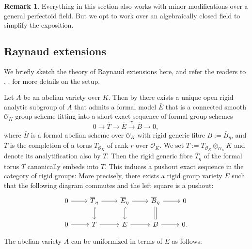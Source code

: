 \documentclass[10pt,oneside]{amsart}
\theoremstyle{definition}
\newtheorem{remark}[theorem]{Remark}
\begin{document}
	
	\begin{remark}\label{Remark on dealing with general perfectoid fields by Galois descent}
		Everything in this section also works with minor modifications over a general perfectoid field. But we opt to work over an algebraically closed field to simplify the exposition.
	\end{remark}
	
	
	\subsection{Raynaud extensions}
	
        We briefly sketch the theory of Raynaud extensions here, and refer the readers to \cite[\S8]{Bosch-Lut}, \cite[\S1]{BL}, \cite[\S8]{Lut-survey}\cite[\S6.1]{Lut} for more details on the setup.

	Let $A$ be an abelian variety over $K$. Then by \cite[Theorem~1.1]{BL} there exists a unique open rigid analytic subgroup of $A$ that admits a formal model $\overline E$ that is a connected smooth $\mathcal O_K$-group scheme fitting into a short exact sequence of formal group schemes
	\begin{equation}\label{formal Raynaud extension}
	0\rightarrow \overline T \rightarrow \overline E \xrightarrow{\pi} \overline{B}\rightarrow 0,
	\end{equation}
	where $\overline{B}$ is a formal abelian scheme over $\mathcal O_K$ with rigid generic fibre $B:=\overline{B}_\eta$, and $\overline{T}$ is the completion of a torus $T_{\mathcal O_K}$ of rank $r$ over $\mathcal O_K$.
	We set $T:=T_{\mathcal O_K}\otimes_{\mathcal O_K}K$ and denote its analytification also by $T$. Then the rigid generic fibre $\overline{T}_\eta$ of the formal torus $\overline{T}$ canonically embeds into $T$. This induces a pushout exact sequence in the category of rigid groups: More precisely, there exists a rigid group variety $E$ such that the following diagram commutes and the left square is a pushout:
		\begin{equation}\label{Raynaud diagram}
		\begin{tikzcd}
			0 \arrow[r] & \overline{T}_\eta \arrow[d, hook] \arrow[r] & \overline{E}_\eta \arrow[d, hook] \arrow[r] & \overline{B}_\eta \arrow[d,equal] \arrow[r] & 0 \\
			0 \arrow[r] & T \arrow[r] & E \arrow[r] & B \arrow[r] & 0.
		\end{tikzcd}
		\end{equation}
	
	The abelian variety $A$ can be uniformized in terms of $E$ as follows:
	
\end{document}
